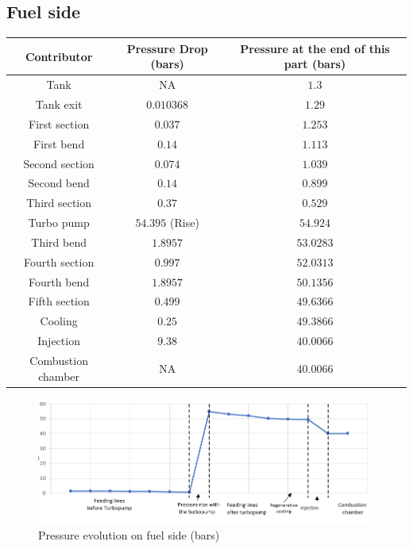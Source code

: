 \subsection{Fuel side}
\begin{tabular}[H]{|c|c|c|}
	\hline
	\cellcolor{gray!50}Contributor& \cellcolor{gray!50}Pressure Drop (bars) & \cellcolor{gray!50}Pressure at the end of this part (bars)\\
	\hline
	Tank & NA & $1.3$ \\
	\hline
	Tank exit & $0.010368$ & $1.29$\\
	\hline
	First section & $0.037$ &$1.253$\\
	\hline
	First bend &$0.14$ &$1.113$\\
	\hline
	Second section &$0.074$ &$1.039$\\
	\hline
	Second bend &$0.14$ &$0.899$\\
	\hline
	Third section &$0.37$ &$0.529$\\
	\hline
	Turbo pump & $54.395 $ (Rise) &$54.924$\\
	\hline
	Third bend &$1.8957$ &$53.0283$\\
	\hline
	Fourth section &$0.997$ &$52.0313$\\
	\hline
	Fourth bend &$1.8957$ &$50.1356$\\
	\hline
	Fifth section &$0.499$ &$49.6366$\\
	\hline
	Cooling &$0.25$ &$49.3866$\\
	\hline
	Injection &$9.38$ &$40.0066$\\
	\hline
	Combustion chamber & NA &$40.0066$\\
	\hline
\end{tabular}
\begin{figure}[H]
	\centering
	\includegraphics[width=\linewidth]{fuelchart}
	\caption{Pressure evolution on fuel side (bars)}
\end{figure}
